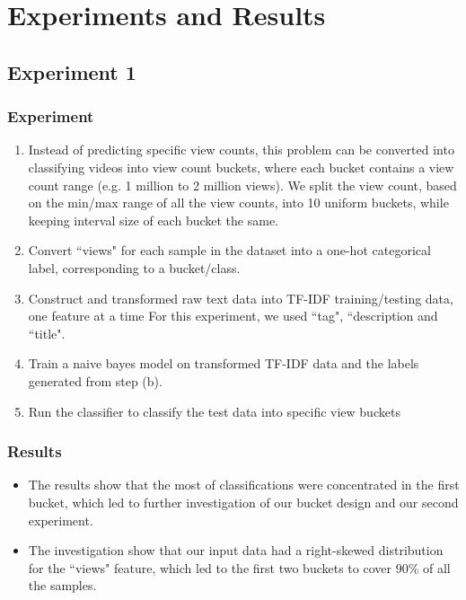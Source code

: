\documentclass[english]{article}
\begin{document}
\section{Experiments and Results}
\subsection{Experiment 1}
\subsubsection{Experiment}
\begin{enumerate}
\item Instead of predicting specific view counts, this problem can be converted into classifying videos into view count buckets, where each bucket contains a view count range (e.g. 1 million to 2 million views). We split the view count, based on the min/max range of all the view counts, into 10 uniform buckets, while keeping interval size of each bucket the same. 
\item Convert ``views" for each sample in the dataset into a one-hot categorical label, corresponding to a bucket/class.
\item Construct and transformed raw text data into TF-IDF training/testing data, one feature at a time For this experiment, we used ``tag", ``description and ``title". 
\item Train a naive bayes model on transformed TF-IDF data and the labels generated from step (b).
\item Run the classifier to classify the test data into specific view buckets
\end{enumerate}
\subsubsection{Results}
\begin{itemize}
    \item The results show that the most of classifications were concentrated in the first bucket, which led to further investigation of our bucket design and our second experiment.
    \item The investigation show that our input data had a right-skewed distribution for the ``views" feature, which led to the first two buckets to cover 90\% of all the samples.
    
\end{itemize}
\end{document}
